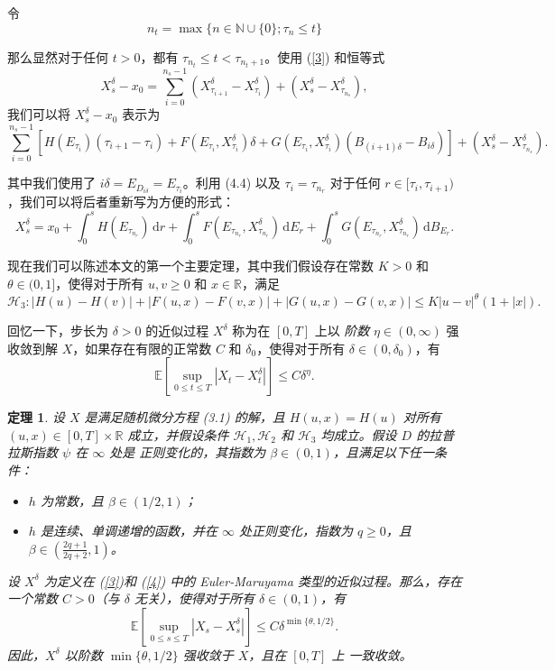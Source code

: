 \documentclass[12pt,final]{article}
\numberwithin{equation}{section}
\numberwithin{figure}{section}
\numberwithin{table}{section}
\theoremstyle{plain}
\newtheorem{theorem}{定理}[section]
\begin{document}
	令
	\[
	n_t = \max\{n \in \mathbb{N} \cup \{0\}; \tau_n \leq t\} 
	\]
	
	
	那么显然对于任何 \( t > 0 \)，都有 \( \tau_{n_{t}} \leq t < \tau_{n_{t}+1} \)。使用 (\ref{3}) 和恒等式
	\[
	X_{s}^{\delta} - x_{0} = \sum_{i=0}^{n_{s}-1} \left(X_{\tau_{i+1}}^{\delta} - X_{\tau_{i}}^{\delta}\right) + \left(X_{s}^{\delta} - X_{\tau_{n_{s}}}^{\delta}\right),
	\]
	我们可以将 \( X_{s}^{\delta} - x_{0} \) 表示为
	\[
	\sum_{i=0}^{n_s-1} \left[ H(E_{\tau_i})(\tau_{i+1} - \tau_i) + F(E_{\tau_i}, X_{\tau_i}^\delta) \delta + G(E_{\tau_i}, X_{\tau_i}^\delta) (B_{(i+1)\delta} - B_{i\delta}) \right] + \left( X_s^\delta - X_{\tau_{n_s}}^\delta \right).
	\]
	
	其中我们使用了 $i\delta = E_{D_{i\delta}} = E_{\tau_i}$。利用 (4.4) 以及 $\tau_i = \tau_{n_r}$ 对于任何 $r \in [\tau_i, \tau_{i+1})$，我们可以将后者重新写为方便的形式：
	\begin{equation}\label{5}
		X_s^\delta = x_0 + \int_0^s H(E_{\tau_{n_r}}) \, \mathrm{d}r + \int_0^s F(E_{\tau_{n_r}}, X_{\tau_{n_r}}^\delta) \, \mathrm{d}E_r + \int_0^s G(E_{\tau_{n_r}}, X_{\tau_{n_r}}^\delta) \, \mathrm{d}B_{E_r}.
	\end{equation}
	
	现在我们可以陈述本文的第一个主要定理，其中我们假设存在常数 $K > 0$ 和 $\theta \in (0, 1]$，使得对于所有 $u, v \geq 0$ 和 $x \in \mathbb{R}$，满足
	\[
	\mathcal{H}_3: |H(u) - H(v)| + |F(u, x) - F(v, x)| + |G(u, x) - G(v, x)| \leq K |u - v|^\theta (1 + |x|).
	\]
	
	回忆一下，步长为 $\delta > 0$ 的近似过程 $X^\delta$ 称为在 $[0, T]$ 上以 \textit{阶数} $\eta \in (0, \infty)$ 强收敛到解 $X$，如果存在有限的正常数 $C$ 和 $\delta_0$，使得对于所有 $\delta \in (0, \delta_0)$，有
	\[
	\mathbb{E} \left[ \sup_{0 \leq t \leq T} |X_t - X_t^\delta| \right] \leq C \delta^\eta.
	\]
	
	\begin{theorem}\label{th}
		设 $X$ 是满足随机微分方程 (3.1) 的解，且 $H(u, x) = H(u)$ 对所有 $(u, x) \in [0, T] \times \mathbb{R}$ 成立，并假设条件 $\mathcal{H}_1, \mathcal{H}_2$ 和 $\mathcal{H}_3$ 均成立。假设 $D$ 的拉普拉斯指数 $\psi$ 在 $\infty$ 处是 \textit{正则变化的}，其指数为 $\beta \in (0, 1)$，且满足以下任一条件：
		
		\begin{itemize}
			\item[(a)] $h$ 为常数，且 $\beta \in (1/2, 1)$；
			\item[(b)] $h$ 是连续、单调递增的函数，并在 $\infty$ 处正则变化，指数为 $q \geq 0$，且 $\beta \in \left(\frac{2q + 1}{2q + 2}, 1\right)$。
		\end{itemize}
		设 $X^\delta$ 为定义在 (\ref{3})和 (\ref{4}) 中的 Euler-Maruyama 类型的近似过程。那么，存在一个常数 $C > 0$（与 $\delta$ 无关），使得对于所有 $\delta \in (0, 1)$，有
		\[
		\mathbb{E} \left[\sup_{0 \leq s \leq T} |X_s - X_s^\delta|\right] \leq C \delta^{\min\{\theta, 1/2\}}.
		\]
		因此，$X^\delta$ \textit{以阶数} $\min\{\theta, 1/2\}$ \textit{强收敛于} $X$，且在 $[0, T]$ 上 \textit{一致收敛}。
	\end{theorem}
	
\end{document}
